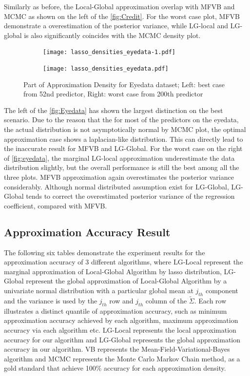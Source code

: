 Similarly as before, the Local-Global approximation overlap with MFVB and MCMC as shown on the left of the \autoref{fig:Credit}. For the worst case plot, MFVB demonstrate a overestimation of the posterior variance, while LG-local and LG-global is also significantly coincides with the MCMC density plot.

\begin{figure}[h]
	\begin{subfigure}{0.5\textwidth}
		\centering
		\texttt{[image: lasso\_densities\_eyedata-1.pdf]}
	\end{subfigure}
	\begin{subfigure}{0.5\textwidth}
		\texttt{[image: lasso\_densities\_eyedata.pdf]}
	\end{subfigure}
	\caption{Part of Approximation Density for Eyedata dataset; Left: best case from 52nd predictor, Right: worst case from 200th predictor}
	\label{fig:Eyedata}
\end{figure}

The left of the \autoref{fig:Eyedata} has shown the largest distinction on the best scenario. Due to the reason that the for most of the predictors on the eyedata, the actual distribution is not asymptotically normal by MCMC plot, the optimal approximation case shows a laplacian-like distribution. This can directly lead to the inaccurate result for MFVB and LG-Global.
For the worst case on the right of \autoref{fig:eyedata}, the marginal LG-local approximation underestimate the data distribution slightly, but the overall performance is still the best among all the three plots. 
MFVB approximation again overestimates the posterior variance considerably.
Although normal distributed assumption exist for LG-Global, LG-Global tends to correct the overestimated posterior variance of the regression coefficient, compared with MFVB. 

\newpage
\subsection{Approximation Accuracy Result}
The following six tables demonstrate the experiment results for the approximation accuracy of 3 different algorithms, where LG-Local represent the marginal approximation of Local-Global Algorithm by lasso distribution, LG-Global represent the global approximation of Local-Global Algorithm by a univariate normal distribution with a particular global mean at $j_{th}$ component and the variance is used by the $j_{th}$ row and $j_{th}$ column of the $\tilde{\Sigma}$.
Each row illustrates a distinct quantile of approximation accuracy, such as minimum approximation accuracy achieved by each algorithm, maximum approximation accuracy via each algorithm etc.
LG-Local represents the local approximation accuracy for our algorithm and LG-Global represents the global approximation accuracy in our algorithm. VB represents the Mean-Field-Variational-Bayes algorithm and MCMC represents the Monte Carlo Markov Chain method, as a gold standard that achieve 100\% accuracy for each approximation density.

